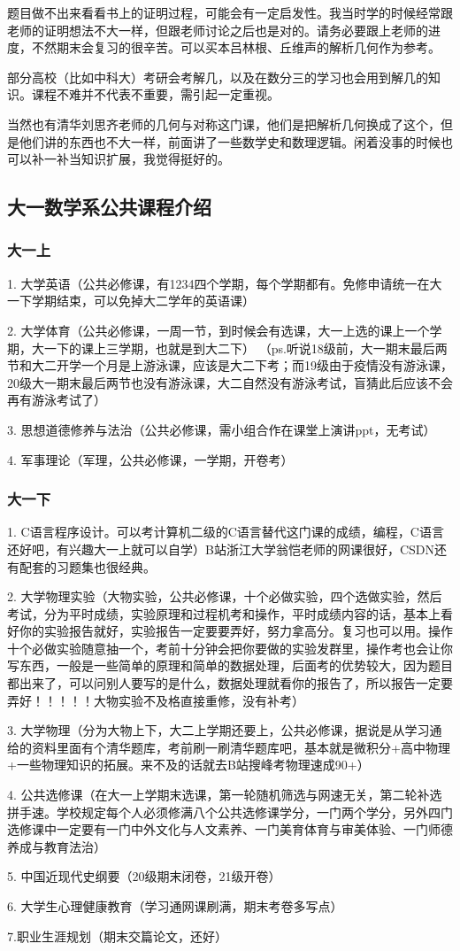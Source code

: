 \documentclass{my_paper}
\begin{document}
题目做不出来看看书上的证明过程，可能会有一定启发性。我当时学的时候经常跟老师的证明想法不大一样，但跟老师讨论之后也是对的。请务必要跟上老师的进度，不然期末会复习的很辛苦。可以买本吕林根、丘维声的解析几何作为参考。

部分高校（比如中科大）考研会考解几，以及在数分三的学习也会用到解几的知识。课程不难并不代表不重要，需引起一定重视。

当然也有清华刘思齐老师的几何与对称这门课，他们是把解析几何换成了这个，但是他们讲的东西也不大一样，前面讲了一些数学史和数理逻辑。闲着没事的时候也可以补一补当知识扩展，我觉得挺好的。

\subsection{大一数学系公共课程介绍}
\subsubsection{大一上}
1. 大学英语（公共必修课，有1234四个学期，每个学期都有。免修申请统一在大一下学期结束，可以免掉大二学年的英语课）

2. 大学体育（公共必修课，一周一节，到时候会有选课，大一上选的课上一个学期，大一下的课上三学期，也就是到大二下）
（ps.听说18级前，大一期末最后两节和大二开学一个月是上游泳课，应该是大二下考；而19级由于疫情没有游泳课，20级大一期末最后两节也没有游泳课，大二自然没有游泳考试，盲猜此后应该不会再有游泳考试了）

3. 思想道德修养与法治（公共必修课，需小组合作在课堂上演讲ppt，无考试）

4. 军事理论（军理，公共必修课，一学期，开卷考）

\subsubsection{大一下}
1. C语言程序设计。可以考计算机二级的C语言替代这门课的成绩，编程，C语言还好吧，有兴趣大一上就可以自学）B站浙江大学翁恺老师的网课很好，CSDN还有配套的习题集也很经典。

2. 大学物理实验（大物实验，公共必修课，十个必做实验，四个选做实验，然后考试，分为平时成绩，实验原理和过程机考和操作，平时成绩内容的话，基本上看好你的实验报告就好，实验报告一定要要弄好，努力拿高分。复习也可以用。操作十个必做实验随意抽一个，考前十分钟会把你要做的实验发群里，操作考也会让你写东西，一般是一些简单的原理和简单的数据处理，后面考的优势较大，因为题目都出来了，可以问别人要写的是什么，数据处理就看你的报告了，所以报告一定要弄好！！！！！大物实验不及格直接重修，没有补考）

3. 大学物理（分为大物上下，大二上学期还要上，公共必修课，据说是从学习通给的资料里面有个清华题库，考前刷一刷清华题库吧，基本就是微积分+高中物理+一些物理知识的拓展。来不及的话就去B站搜峰考物理速成90+）

4. 公共选修课（在大一上学期末选课，第一轮随机筛选与网速无关，第二轮补选拼手速。学校规定每个人必须修满八个公共选修课学分，一门两个学分，另外四门选修课中一定要有一门中外文化与人文素养、一门美育体育与审美体验、一门师德养成与教育法治）

5. 中国近现代史纲要（20级期末闭卷，21级开卷）

6. 大学生心理健康教育（学习通网课刷满，期末考卷多写点）

7.职业生涯规划（期末交篇论文，还好）
\end{document}
